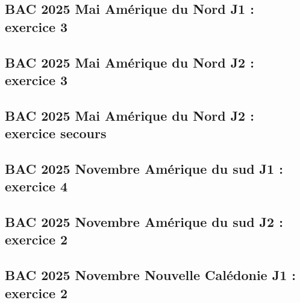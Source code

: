 \documentclass[lang=fr,edition=teacher,layout=sheet]{mxbook}
\begin{document}
\begingroup\endgroup
\par\bigskip
{}\subsection*{BAC 2025 Mai Amérique du Nord J1 : exercice 3}
\begingroup\endgroup
\par\bigskip
{}\subsection*{BAC 2025 Mai Amérique du Nord J2 : exercice 3}
\begingroup\endgroup
\par\bigskip
{}\subsection*{BAC 2025 Mai Amérique du Nord J2 : exercice secours}
\begingroup\endgroup
\par\bigskip
{}\subsection*{BAC 2025 Novembre Amérique du sud J1 : exercice 4}
\begingroup\endgroup
\par\bigskip
{}\subsection*{BAC 2025 Novembre Amérique du sud J2 : exercice 2}
\begingroup\endgroup
\par\bigskip
{}\subsection*{BAC 2025 Novembre Nouvelle Calédonie J1 : exercice 2}
\begingroup\endgroup
\par\bigskip
\end{document}
